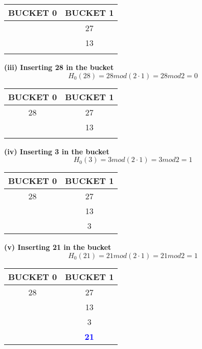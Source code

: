\begin{center}
\begin{tabular}{ |c|c| } 
 \hline
 \textbf{\color{red}{P}} BUCKET 0 & BUCKET 1 \\ [0.5ex] 
 \hline\hline
 \hline
   & 27 \\ 
   & 13 \\
   &    \\
   \hline
\end{tabular}
\end{center}

\newpage

\textbf{(iii) Inserting 28 in the bucket}
\[H_0(28) = 28 mod (2 \cdot 1)  = 28 mod 2 = 0\] 

\begin{center}
\begin{tabular}{ |c|c| } 
 \hline
 \textbf{\color{red}{P}} BUCKET 0 & BUCKET 1 \\ [0.5ex] 
 \hline\hline
 \hline
  28 & 27 \\ 
   & 13   \\
   &      \\
 \hline
\end{tabular}
\end{center}

\textbf{(iv) Inserting 3 in the bucket}
\[H_0(3) = 3 mod (2 \cdot 1)  = 3 mod 2 = 1\] 

\begin{center}
\begin{tabular}{ |c|c| } 
 \hline
 \textbf{\color{red}{P}} BUCKET 0 & BUCKET 1 \\ [0.5ex] 
 \hline\hline
 \hline
  28 & 27 \\ 
   & 13   \\
   & 3 \\
 \hline
\end{tabular}
\end{center}

\textbf{(v) Inserting 21 in the bucket}
\[H_0(21) = 21 mod (2 \cdot 1)  = 21 mod 2 = 1\] 

\begin{center}
\begin{tabular}{ |c|c| } 
 \hline
 \textbf{\color{red}{P}} BUCKET 0 & BUCKET 1 \\ [0.5ex] 
 \hline\hline
 \hline
  28 & 27 \\ 
   & 13   \\
   & 3 \\
 \hline
    & \textbf{\textcolor{blue}{21}}
    
\end{tabular}
\end{center}

